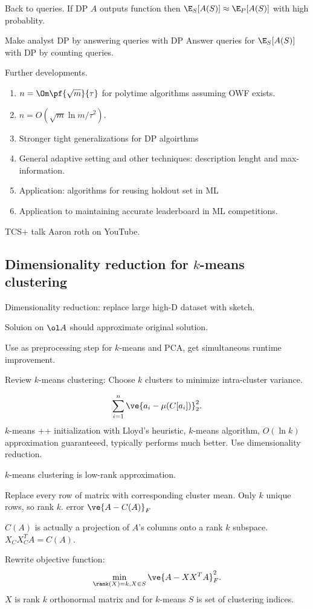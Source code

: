 Back to queries.
If DP $A$ outputs function then $\E_S[A(S)]\approx \E_P[A(S)]$ with high probablity.

Make analyst DP by answering queries with DP
Answer queries for $\E_S[A(S)]$ with DP by counting queries.

Further developments.
\begin{enumerate}
\item
$n=\Om\pf{\sqrt m}{\tau}$ for polytime algorithms assuming OWF exists.
\item
$n=O(\sqrt m\ln m/\tau^2)$. 
\item 
Stronger tight generalizations for DP algoirthms
\item
General adaptive setting and other techniques: description lenght and max-information.
\item Application: algorithms for reusing holdout set in ML
\item
Application to maintaining accurate leaderboard in ML competitions. 
\end{enumerate}
TCS+ talk Aaron roth on YouTube.


%

\subsection{Dimensionality reduction for $k$-means clustering}
Dimensionality reduction: replace large high-D dataset with sketch.

Soluion on $\ol A$ should approximate original solution.

Use as preprocessing step for $k$-means and PCA, get simultaneous runtime improvement.

Review $k$-means clustering: Choose $k$ clusters to minimize intra-cluster variance. 

\[\sum_{i=1}^n \ve{a_i-\mu(C[a_i])}_2^2.\]
$k$-means ++ initialization with Lloyd's heuristic, $k$-means algorithm, $O(\ln k)$ approximation guaranteeed, typically performs much better. Use dimensionality reduction.


$k$-means clustering is low-rank approximation.

Replace every row of matrix with corresponding cluster mean. Only $k$ unique rows, so rank $k$. error $\ve{A-C(A)}_F$ 

$C(A)$ is actually a projection of $A$'s columns onto a rank $k$ subspace. %
$X_CX_C^T A = C(A)$.

Rewrite objective function:
\[
\min_{\rank(X)=k,X\in S} \ve{A-XX^TA}_F^2.
\]
$X$ is rank $k$ orthonormal matrix and for $k$-means $S$ is set of clustering indices.

